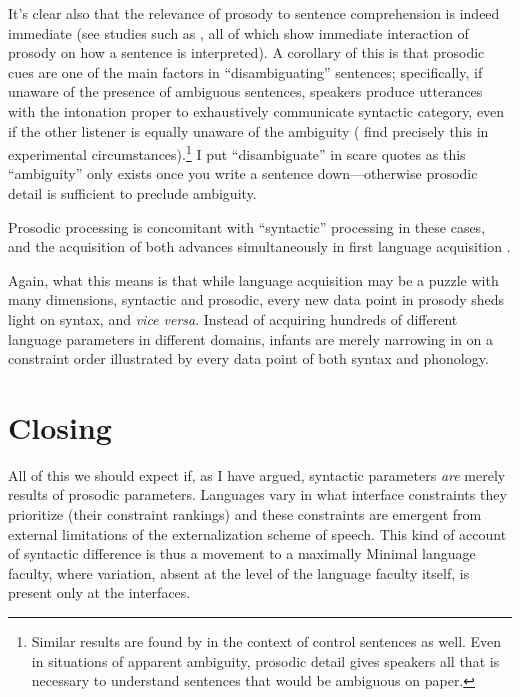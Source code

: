 \documentclass{article}
\begin{document}
It's clear also that the relevance of prosody to sentence comprehension is indeed immediate (see studies such as \textcite{eckstein06,kerkhofs07,sammler10}, all of which show immediate interaction of prosody on how a sentence is interpreted).
A corollary of this is that prosodic cues are one of the main factors in ``disambiguating'' sentences; specifically, if unaware of the presence of ambiguous sentences, speakers produce utterances with the intonation proper to exhaustively communicate syntactic category, even if the other listener is equally unaware of the ambiguity (\textcite{millotte07} find precisely this in experimental circumstances).\footnote{Similar results are found by \textcite{bogels09} in the context of control sentences as well. Even in situations of apparent ambiguity, prosodic detail gives speakers all that is necessary to understand sentences that would be ambiguous on paper.}
I put ``disambiguate'' in scare quotes as this ``ambiguity'' only exists once you write a sentence down---otherwise prosodic detail is sufficient to preclude ambiguity.

Prosodic processing is concomitant with ``syntactic'' processing in these cases, and the acquisition of both advances simultaneously in first language acquisition \parencite{mannel11}.

Again, what this means is that while language acquisition may be a puzzle with many dimensions, syntactic and prosodic, every new data point in prosody sheds light on syntax, and \textit{vice versa}.
Instead of acquiring hundreds of different language parameters in different domains, infants are merely narrowing in on a constraint order illustrated by every data point of both syntax and phonology.






\section{Closing}

All of this we should expect if, as I have argued, syntactic parameters \emph{are} merely results of prosodic parameters.
Languages vary in what interface constraints they prioritize (their constraint rankings) and these constraints are emergent from external limitations of the externalization scheme of speech.
This kind of account of syntactic difference is thus a movement to a maximally Minimal language faculty, where variation, absent at the level of the language faculty itself, is present only at the interfaces.
\end{document}

